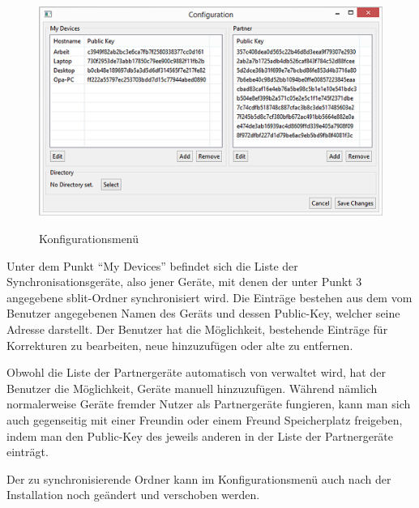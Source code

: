 \begin{figure}[H]
	\centering
	\includegraphics[]{images/config_gui.jpg}
	\label{config_gui}
  \caption{Konfigurationsmenü}
\end{figure}
\begin{description}

		Unter dem Punkt “My Devices” befindet sich die Liste der
		Synchronisationsgeräte, also jener Geräte, mit denen der unter Punkt 3
		angegebene sblit-Ordner synchronisiert wird. Die Einträge
		bestehen aus dem vom Benutzer angegebenen Namen des Geräts und dessen
		Public-Key, welcher seine Adresse darstellt. Der Benutzer hat die
		Möglichkeit, bestehende Einträge für Korrekturen zu bearbeiten, neue
		hinzuzufügen oder alte zu entfernen.

		Obwohl die Liste der Partnergeräte automatisch von \sblit verwaltet wird,
		hat der Benutzer die Möglichkeit, Geräte manuell hinzuzufügen. Während
		nämlich normalerweise Geräte fremder Nutzer als Partnergeräte fungieren,
		kann man sich auch gegenseitig mit einer Freundin oder einem Freund
		Speicherplatz freigeben, indem man den Public-Key des jeweils anderen in der
		Liste der Partnergeräte einträgt.

		Der zu synchronisierende Ordner kann im Konfigurationsmenü auch nach der
		Installation noch geändert und verschoben werden.

\end{description}
